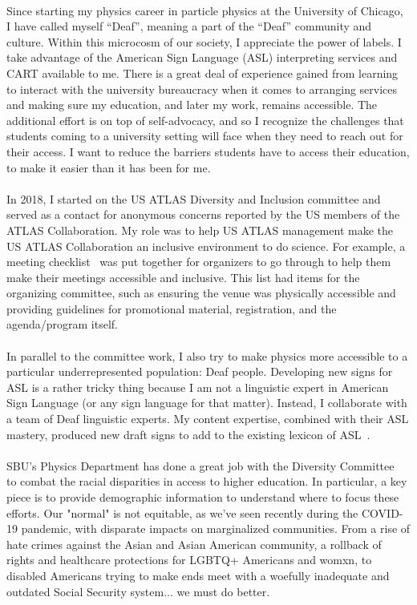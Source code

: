 \documentclass[10pt,a4paper,sans]{moderncv} %
\begin{document}
\\
Since starting my physics career in particle physics at the University of Chicago, I have called myself ``Deaf'', meaning a part of the ``Deaf'' community and culture. Within this microcosm of our society, I appreciate the power of labels. I take advantage of the American Sign Language (ASL) interpreting services and CART available to me. There is a great deal of experience gained from learning to interact with the university bureaucracy when it comes to arranging services and making sure my education, and later my work, remains accessible. The additional effort is on top of self-advocacy, and so I recognize the challenges that students coming to a university setting will face when they need to reach out for their access. I want to reduce the barriers students have to access their education, to make it easier than it has been for me.
\\
\\
In 2018, I started on the US ATLAS Diversity and Inclusion committee and served as a contact for anonymous concerns reported by the US members of the ATLAS Collaboration. My role was to help US ATLAS management make the US ATLAS Collaboration an inclusive environment to do science. For example, a meeting checklist~\cite{Assamagan:2022oka} was put together for organizers to go through to help them make their meetings accessible and inclusive. This list had items for the organizing committee, such as ensuring the venue was physically accessible and providing guidelines for promotional material, registration, and the agenda/program itself.
\\
\\
In parallel to the committee work, I also try to make physics more accessible to a particular underrepresented population: Deaf people. Developing new signs for ASL is a rather tricky thing because I am not a linguistic expert in American Sign Language (or any sign language for that matter). Instead, I collaborate with a team of Deaf linguistic experts. My content expertise, combined with their ASL mastery, produced new draft signs to add to the existing lexicon of ASL~\cite{ICPS2021, MatterInterpretation}.
\\
\\
SBU's Physics Department has done a great job with the Diversity Committee~\cite{diversitypage} to combat the racial disparities in access to higher education. In particular, a key piece is to provide demographic information to understand where to focus these efforts. Our "normal" is not equitable, as we've seen recently during the COVID-19 pandemic, with disparate impacts on marginalized communities. From a rise of hate crimes against the Asian and Asian American community, a rollback of rights and healthcare protections for LGBTQ+ Americans and womxn, to disabled Americans trying to make ends meet with a woefully inadequate and outdated Social Security system... we must do better.
\end{document}
